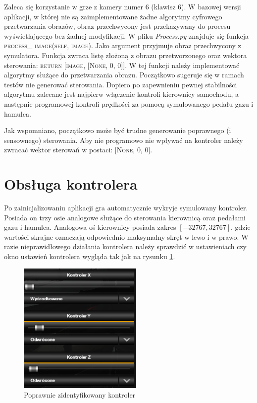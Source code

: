 Zaleca się korzystanie w grze z kamery numer 6 (klawisz 6).
W bazowej wersji aplikacji, w której nie są zaimplementowane żadne algorytmy cyfrowego przetwarzania obrazów, obraz przechwycony jest przekazywany do procesu wyświetlającego bez żadnej modyfikacji. W pliku \textit{Process.py} znajduje się funkcja \textsc{process\_ image(self, image)}. Jako argument przyjmuje obraz przechwycony z symulatora. Funkcja zwraca listę złożoną z obrazu przetworzonego oraz wektora sterowania: \textsc{return [image, [None, 0, 0]]}. W tej funkcji należy implementować algorytmy służące do przetwarzania obrazu. Początkowo sugeruje się w ramach testów nie generować sterowania. Dopiero po zapewnieniu pewnej stabilności algorytmu zalecane jest najpierw włączenie kontroli kierownicy samochodu, a następnie programowej kontroli prędkości za pomocą symulowanego pedału gazu i hamulca.

Jak wspomniano, początkowo może być trudne generowanie poprawnego (i sensownego) sterowania. Aby nie programowo nie wpływać na kontroler należy zwracać wektor sterowań w postaci: \textsc{[None, 0, 0]}.

\section{Obsługa kontrolera}
Po zainicjalizowaniu aplikacji gra automatycznie wykryje symulowany kontroler. Posiada on trzy osie analogowe służące do sterowania kierownicą oraz pedałami gazu i hamulca. Analogowa oś kierownicy posiada zakres $[-32767, 32767]$, gdzie wartości skrajne oznaczają odpowiednio maksymalny skręt w lewo i w prawo. W razie nieprawidłowego działania kontrolera należy sprawdzić w ustawieniach czy okno ustawień kontrolera wygląda tak jak na rysunku \ref{fig:appendix1_controller}.

\begin{figure}
  \centering
  \includegraphics[width=6cm]{img/appendix1_controller.png}
  \caption{Poprawnie zidentyfikowany kontroler}
  \label{fig:appendix1_controller}
\end{figure}

